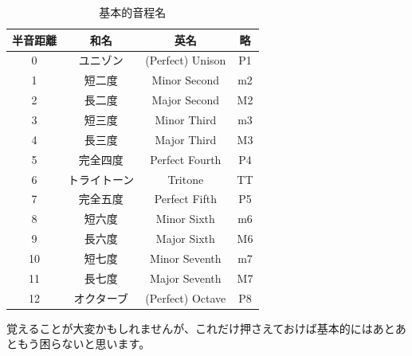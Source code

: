 \documentclass[11pt]{ltjarticle}
\begin{document}
\begin{table}
    \centering
    \caption{基本的音程名}
    \begin{tabular}{|c|c|c|c|}\hline
        半音距離 & 和名 & 英名 & 略\\ \hline
        0 & ユニゾン &  (Perfect) Unison& P1\\
        1 & 短二度 &  Minor Second& m2\\
        2 & 長二度 &  Major Second& M2\\
        3 & 短三度 &  Minor Third& m3\\
        4 & 長三度 &  Major Third& M3\\
        5 & 完全四度 &  Perfect Fourth& P4\\
        6 & トライトーン&  Tritone& TT\\
        7 &  完全五度 &  Perfect Fifth& P5\\
        8 &  短六度 &  Minor Sixth& m6\\
        9 &  長六度 &  Major Sixth& M6\\
        10 & 短七度 &  Minor Seventh& m7\\
        11 &  長七度 &  Major Seventh& M7\\
        12 &  オクターブ &  (Perfect) Octave& P8\\\hline
    \end{tabular}
    \label{tab:intervals}
\end{table}
覚えることが大変かもしれませんが、これだけ押さえておけば基本的にはあとあともう困らないと思います。
\end{document}
